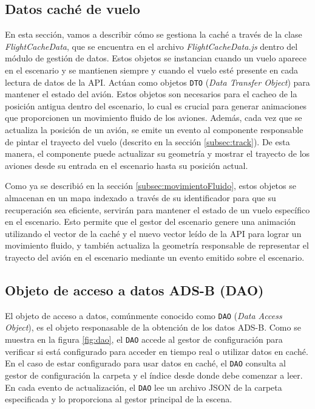 \documentclass[a4paper, 11pt]{book}
\begin{document}
\subsection{Datos caché de vuelo}
\label{subsec:datosCacheVuelo}
En esta sección, vamos a describir cómo se gestiona la caché a través de la clase \emph{FlightCacheData}, que se encuentra en el archivo \emph{FlightCacheData.js} dentro del módulo de gestión de datos.
Estos objetos se instancian cuando un vuelo aparece en el escenario y se mantienen siempre y cuando el vuelo esté presente en cada lectura de datos de la \textsc{API}. Actúan como objetos \texttt{\gls{DTO}} (\emph{Data Transfer Object}) para mantener el estado del avión.
Estos objetos son necesarios para el cacheo de la posición antigua dentro del escenario, lo cual es crucial para generar animaciones que proporcionen un movimiento fluido de los aviones. 
Además, cada vez que se actualiza la posición de un avión, se emite un evento al componente responsable de pintar el trayecto del vuelo (descrito en la sección \ref{subsec:track}). De esta manera, el componente puede actualizar su geometría y mostrar el trayecto de los aviones desde su entrada en el escenario hasta su posición actual.

Como ya se describió en la sección \ref{subsec:movimientoFluido}, estos objetos se almacenan en un mapa indexado a través de su identificador para que su recuperación sea eficiente, servirán para mantener el estado de un vuelo específico en el escenario. Esto permite que el gestor del escenario genere una animación utilizando el vector de la caché y el nuevo vector leído de la API para lograr un movimiento fluido, y también actualiza la geometría responsable de representar el trayecto del avión en el escenario mediante un evento emitido sobre el escenario.
\subsection{Objeto de acceso a datos ADS-B (\gls{DAO})}
\label{subsec:dao}
El objeto de acceso a datos, comúnmente conocido como \texttt{\gls{DAO}} (\emph{Data Access Object}), es el objeto responasable de la obtención de los datos ADS-B. Como se muestra en la figura \ref{fig:dao}, el \texttt{DAO} accede al gestor de configuración para verificar si está configurado para acceder en tiempo real o utilizar datos en caché. 
En el caso de estar configurado para usar datos en caché, el \texttt{DAO} consulta al gestor de configuración la carpeta y el índice desde donde debe comenzar a leer. En cada evento de actualización, el \texttt{DAO} lee un archivo \textsc{\gls{JSON}} de la carpeta especificada y lo proporciona al gestor principal de la escena.
\end{document}
